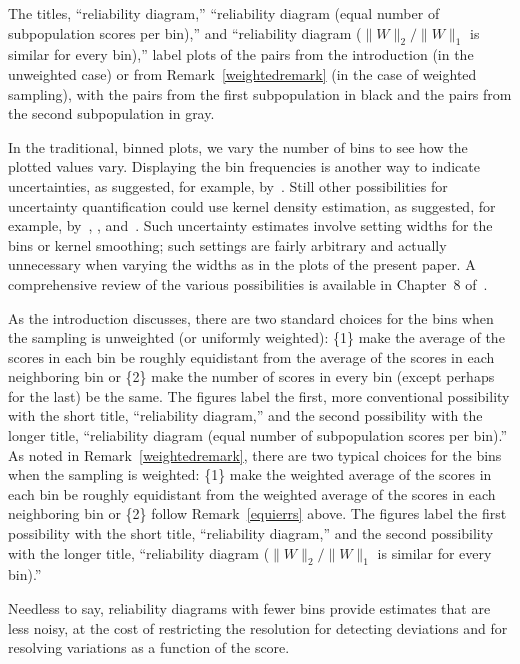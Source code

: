 \documentclass{article}
\begin{document}
The titles, ``reliability diagram,''
``reliability diagram (equal number of subpopulation scores per bin),''
and ``reliability diagram ($\|W\|_2/\|W\|_1$ is similar for every bin),''
label plots of the pairs from the introduction (in the unweighted case)
or from Remark~\ref{weightedremark} (in the case of weighted sampling),
with the pairs from the first subpopulation in black
and the pairs from the second subpopulation in gray.

In the traditional, binned plots,
we vary the number of bins to see how the plotted values vary.
Displaying the bin frequencies is another way to indicate uncertainties,
as suggested, for example, by~\cite{murphy-winkler}.
Still other possibilities for uncertainty quantification could use
kernel density estimation, as suggested, for example,
by~\cite{brocker}, \cite{srihera-stute}, and~\cite{wilks}.
Such uncertainty estimates involve setting widths for the bins
or kernel smoothing; such settings are fairly arbitrary
and actually unnecessary when varying the widths as in the plots
of the present paper.
A comprehensive review of the various possibilities is available
in Chapter~8 of~\cite{wilks}.

As the introduction discusses, there are two standard choices for the bins
when the sampling is unweighted (or uniformly weighted):
\{1\} make the average of the scores in each bin
be roughly equidistant from the average of the scores
in each neighboring bin or
\{2\} make the number of scores in every bin
(except perhaps for the last) be the same.
The figures label the first, more conventional possibility
with the short title, ``reliability diagram,'' and the second possibility
with the longer title,
``reliability diagram (equal number of subpopulation scores per bin).''
As noted in Remark~\ref{weightedremark}, there are two typical choices
for the bins when the sampling is weighted:
\{1\} make the weighted average of the scores in each bin
be roughly equidistant from the weighted average of the scores
in each neighboring bin or
\{2\} follow Remark~\ref{equierrs} above.
The figures label the first possibility with the short title,
``reliability diagram,'' and the second possibility
with the longer title,
``reliability diagram ($\|W\|_2/\|W\|_1$ is similar for every bin).''

Needless to say, reliability diagrams with fewer bins provide estimates
that are less noisy, at the cost of restricting the resolution
for detecting deviations and for resolving variations
as a function of the score.
\end{document}
